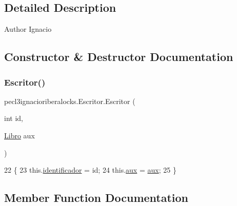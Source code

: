 \subsection{Detailed Description}
\begin{DoxyAuthor}{Author}
Ignacio 
\end{DoxyAuthor}


\subsection{Constructor \& Destructor Documentation}
\mbox{\label{classpecl3ignacioriberalocks_1_1_escritor_a78d90f3839ce3e3db6431ed3e3c3d774}} 
\subsubsection{\texorpdfstring{Escritor()}{Escritor()}}
{\footnotesize\ttfamily pecl3ignacioriberalocks.\+Escritor.\+Escritor (\begin{DoxyParamCaption}\item[{int}]{id,  }\item[{\mbox{\hyperlink{classpecl3ignacioriberalocks_1_1_libro}{Libro}}}]{aux }\end{DoxyParamCaption})\hspace{0.3cm}{\ttfamily [inline]}}


\begin{DoxyCode}
22     \{
23         this.\mbox{\hyperlink{classpecl3ignacioriberalocks_1_1_escritor_a95d141e27b252a1c86ac193df9a56df1}{identificador}} = id;
24         this.\mbox{\hyperlink{classpecl3ignacioriberalocks_1_1_escritor_a9b5a1087cd14e067a353af97ca7515c9}{aux}} = \mbox{\hyperlink{classpecl3ignacioriberalocks_1_1_escritor_a9b5a1087cd14e067a353af97ca7515c9}{aux}};
25     \}
\end{DoxyCode}


\subsection{Member Function Documentation}
\mbox{\label{classpecl3ignacioriberalocks_1_1_escritor_a9daf2d28bfac0b7682e2f2a765c6562a}} 
